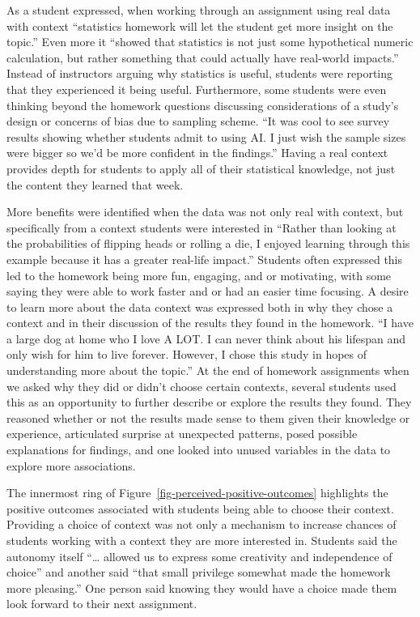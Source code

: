 \documentclass[
  12pt]{article}
\begin{document}
As a student expressed, when working through an assignment using real
data with context ``statistics homework will let the student get more
insight on the topic.'' Even more it ``showed that statistics is not
just some hypothetical numeric calculation, but rather something that
could actually have real-world impacts.'' Instead of instructors arguing
why statistics is useful, students were reporting that they experienced
it being useful. Furthermore, some students were even thinking beyond
the homework questions discussing considerations of a study's design or
concerns of bias due to sampling scheme. ``It was cool to see survey
results showing whether students admit to using AI. I just wish the
sample sizes were bigger so we'd be more confident in the findings.''
Having a real context provides depth for students to apply all of their
statistical knowledge, not just the content they learned that week.

More benefits were identified when the data was not only real with
context, but specifically from a context students were interested in
``Rather than looking at the probabilities of flipping heads or rolling
a die, I enjoyed learning through this example because it has a greater
real-life impact.'' Students often expressed this led to the homework
being more fun, engaging, and or motivating, with some saying they were
able to work faster and or had an easier time focusing. A desire to
learn more about the data context was expressed both in why they chose a
context and in their discussion of the results they found in the
homework. ``I have a large dog at home who I love A LOT. I can never
think about his lifespan and only wish for him to live forever. However,
I chose this study in hopes of understanding more about the topic.'' At
the end of homework assignments when we asked why they did or didn't
choose certain contexts, several students used this as an opportunity to
further describe or explore the results they found. They reasoned
whether or not the results made sense to them given their knowledge or
experience, articulated surprise at unexpected patterns, posed possible
explanations for findings, and one looked into unused variables in the
data to explore more associations.

The innermost ring of Figure~\ref{fig-perceived-positive-outcomes}
highlights the positive outcomes associated with students being able to
choose their context. Providing a choice of context was not only a
mechanism to increase chances of students working with a context they
are more interested in. Students said the autonomy itself ``\ldots{}
allowed us to express some creativity and independence of choice'' and
another said ``that small privilege somewhat made the homework more
pleasing.'' One person said knowing they would have a choice made them
look forward to their next assignment.
\end{document}
